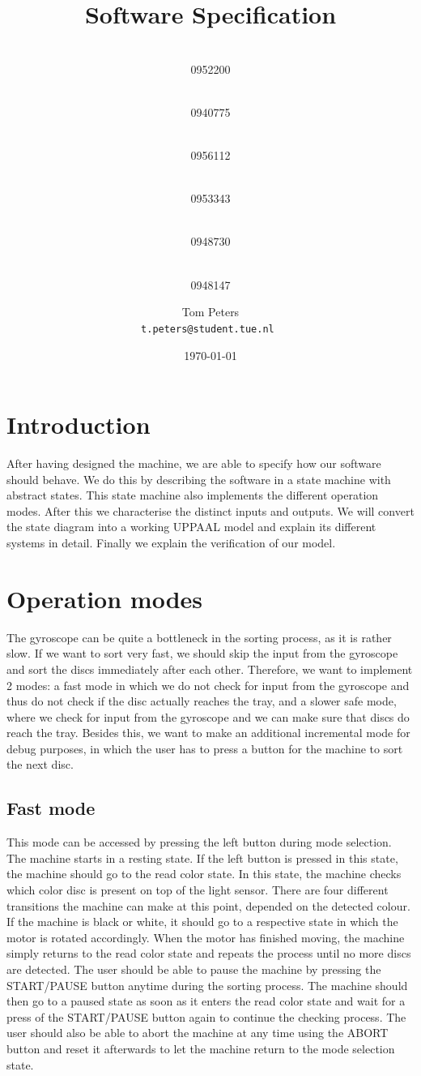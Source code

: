 \documentclass[a4paper,oneside,11pt]{article}
\title{\vspace{-\baselineskip}\sffamily\bfseries Software Specification}
\author{
	\makebox[.25\linewidth]{Sergio van Amerongen}\\0952200 \and
	\makebox[.25\linewidth]{Stefan Cloudt}\\0940775 \and
	\makebox[.25\linewidth]{Daan de Graaf}\\0956112 \and
	\makebox[.25\linewidth]{Robert van Lente}\\0953343 \and
	\makebox[.25\linewidth]{Tom Peters}\\0948730 \and
	\makebox[.25\linewidth]{Berrie Trippe}\\0948147 
	\and \makebox[.75\linewidth]{\textbf{Responsible:}} \and
	Tom Peters\\ \tt{t.peters@student.tue.nl}
}
\date{\today}
\begin{document}
\maketitle

\section{Introduction}
After having designed the machine, we are able to specify how our software should behave. We do this by describing the software in a state machine with abstract states. This state machine also implements the different operation modes. After this we characterise the distinct inputs and outputs. We will convert the state diagram into a working UPPAAL model and explain its different systems in detail. Finally we explain the verification of our model.

\section{Operation modes}
The gyroscope can be quite a bottleneck in the sorting process, as it is rather slow. If we want to sort very fast, we should skip the input from the gyroscope and sort the discs immediately after each other. Therefore, we want to implement 2 modes: a fast mode in which we do not check for input from the gyroscope and thus do not check if the disc actually reaches the tray, and a slower safe mode, where we check for input from the gyroscope and we can make sure that discs do reach the tray. Besides this, we want to make an additional incremental mode for debug purposes, in which the user has to press a button for the machine to sort the next disc.

\subsection{Fast mode}
This mode can be accessed by pressing the left button during mode selection. The machine starts in a resting state. If the left button is pressed in this state, the machine should go to the read color state. In this state, the machine checks which color disc is present on top of the light sensor. There are four different transitions the machine can make at this point, depended on the detected colour. If the machine is black or white, it should go to a respective state in which the motor is rotated accordingly. When the motor has finished moving, the machine simply returns to the read color state and repeats the process until no more discs are detected. The user should be able to pause the machine by pressing the START/PAUSE button anytime during the sorting process. The machine should then go to a paused state as soon as it enters the read color state and wait for a press of the START/PAUSE button again to continue the checking process. The user should also be able to abort the machine at any time using the ABORT button and reset it afterwards to let the machine return to the mode selection state.
\end{document}
